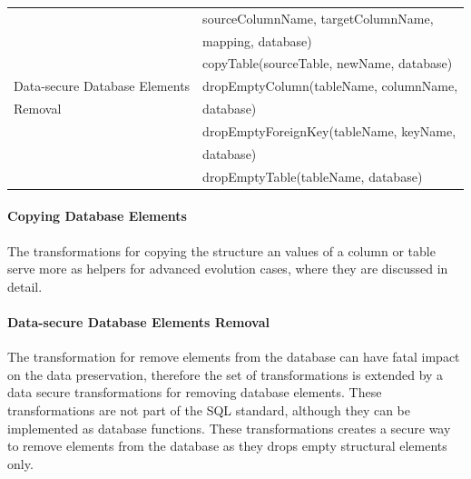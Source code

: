 \documentclass[runningheads]{comsis}
\begin{document}
\begin{table}
\begin{tabular}{ll}
	& \hspace{0.5in} sourceColumnName, targetColumnName, \\ 
	& \hspace{0.5in} mapping, database) \\
	& copyTable(sourceTable, newName, database) \\
	Data-secure Database Elements &
	dropEmptyColumn(tableName, columnName, \\
	Removal & \hspace{0.25in} database) \\
	& dropEmptyForeignKey(tableName, keyName, \\ & \hspace{0.25in} database) \\
	& dropEmptyTable(tableName, database) \\
	\hline
	\end{tabular}
\end{table}

\paragraph{Copying Database Elements} The transformations for copying the structure an values of a column or table serve more as helpers for advanced evolution cases, where they are discussed in detail.


\paragraph{Data-secure Database Elements Removal} The transformation for remove elements from the database can have fatal impact on the data preservation, therefore the set of transformations is extended by a data secure transformations for removing database elements. These transformations are not part of the SQL standard, although they can be implemented as database functions. These transformations creates a secure way to remove elements from the database as they drops empty structural elements only. 
\end{document}
